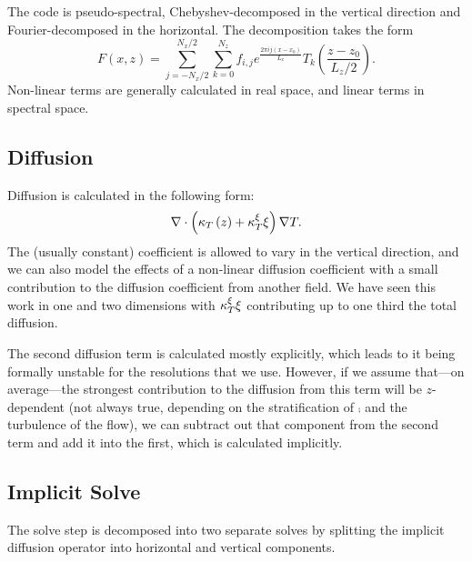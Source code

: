 The code is pseudo-spectral, Chebyshev-decomposed in the vertical direction and Fourier-decomposed in the horizontal.
	The decomposition takes the form
	\begin{equation}
		F\left(x,z\right)=\sum_{j=-N_{x}/2}^{N_{x}/2}\sum_{k=0}^{N_{z}}f_{i,j}e^{\frac{2\pi ij\left(x-x_{0}\right)}{L_{x}}}T_{k}\left(\frac{z-z_{0}}{L_{z}/2}\right).
	\end{equation}
	Non-linear terms are generally calculated in real space, and linear terms in spectral space.


	\subsection{Diffusion} %
	\label{sub:diffusion}

		Diffusion is calculated in the following form:
		\begin{equation}
			\nabla\cdot\left(\kappa_{T}\left(z\right)+\kappa_{T}^{\xi}\xi\right)\nabla T.
		\end{equation}
		The (usually constant) coefficient is allowed to vary in the vertical direction, and we can also model the effects of a non-linear diffusion coefficient with a small contribution to the diffusion coefficient from another field.
		We have seen this work in one and two dimensions with $\kappa_{T}^{\xi}\xi$ contributing up to one third the total diffusion.

		The second diffusion term is calculated mostly explicitly, which leads to it being formally unstable for the resolutions that we use.
		However, if we assume that---on average---the strongest contribution to the diffusion from this term will be $z$-dependent (not always true, depending on the stratification of $\comp$ and the turbulence of the flow), we can subtract out that component from the second term and add it into the first, which is calculated implicitly.


	\subsection{Implicit Solve} %
	\label{sub:solve}

		The solve step is decomposed into two separate solves by splitting the implicit diffusion operator into horizontal and vertical components.
			

